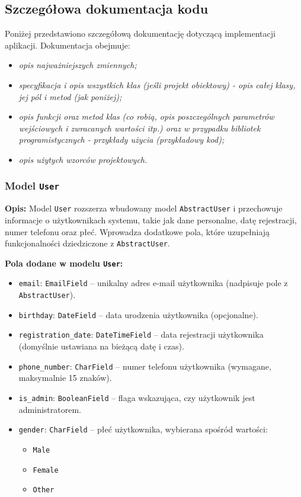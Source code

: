 \documentclass[12pt,a4paper,oneside]{article}
\theoremstyle{definition}
\numberwithin{equation}{section}
\begin{document}
\subsection{Szczegółowa dokumentacja kodu}
Poniżej przedstawiono szczegółową dokumentację dotyczącą implementacji aplikacji. Dokumentacja obejmuje:
\begin{itemize}
\item \textit{opis najważniejszych zmiennych;}
\item \textit{specyfikacja i opis wszystkich klas (jeśli projekt obiektowy) - opis całej klasy, jej pól i metod (jak poniżej);}
\item \textit{opis funkcji oraz metod klas (co robią, opis poszczególnych parametrów wejściowych i zwracanych wartości itp.) oraz w przypadku bibliotek programistycznych - przykłady użycia (przykładowy kod);} 
\item \textit{opis użytych wzorców projektowych.}
\end{itemize}
\subsubsection{Model \texttt{User}}
\textbf{Opis:} 
Model \texttt{User} rozszerza wbudowany model \texttt{AbstractUser} i przechowuje informacje o użytkownikach systemu, takie jak dane personalne, datę rejestracji, numer telefonu oraz płeć. Wprowadza dodatkowe pola, które uzupełniają funkcjonalności dziedziczone z \texttt{AbstractUser}.

\textbf{Pola dodane w modelu \texttt{User}:}
\begin{itemize}
    \item \texttt{email}: \texttt{EmailField} – unikalny adres e-mail użytkownika (nadpisuje pole z \texttt{AbstractUser}).
    \item \texttt{birthday}: \texttt{DateField} – data urodzenia użytkownika (opcjonalne).
    \item \texttt{registration\_date}: \texttt{DateTimeField} – data rejestracji użytkownika (domyślnie ustawiana na bieżącą datę i czas).
    \item \texttt{phone\_number}: \texttt{CharField} – numer telefonu użytkownika (wymagane, maksymalnie 15 znaków).
    \item \texttt{is\_admin}: \texttt{BooleanField} – flaga wskazująca, czy użytkownik jest administratorem.
    \item \texttt{gender}: \texttt{CharField} – płeć użytkownika, wybierana spośród wartości:
    \begin{itemize}
        \item \texttt{Male}
        \item \texttt{Female}
        \item \texttt{Other}
    \end{itemize}
\end{itemize}
\end{document}
